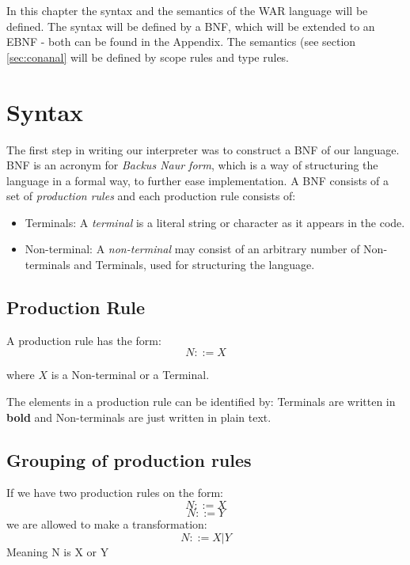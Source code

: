 In this chapter the syntax and the semantics of the WAR language will be defined. The syntax will be defined by a BNF, which will be extended to an EBNF - both can be found in the Appendix. The semantics (see section \ref{sec:conanal} will be defined by scope rules and type rules.
\section{Syntax}
	The first step in writing our interpreter was to construct a BNF of our language. 
	BNF is an acronym for {\it Backus Naur form}, which is a way of
	structuring the language in a formal way, to further ease implementation. 
	A BNF consists of a set of {\it production rules} and each
	production rule consists of:
	\begin{itemize}
		 \item Terminals: A {\it terminal } is a literal string or character as it appears in the code.
		 \item Non-terminal: A {\it non-terminal } may consist of an arbitrary number of Non-terminals and Terminals, used for structuring the language.
	\end{itemize}
	
	\subsection*{Production Rule}
		A production rule has the form:
		\begin{equation}
			N ::= X
		\end{equation}
		
		where $X$ is a Non-terminal or a Terminal.
		
		The elements in a production rule can be identified by:
		Terminals are written in {\bf bold } and 
		Non-terminals are just written in plain text.
	\subsection*{Grouping of production rules}
		If we have two production rules on the form:
		\begin{equation}
			N ::= X 
		\end{equation}
		\begin{equation}
			N ::= Y 
		\end{equation}
		we are allowed to make a transformation:
		\begin{equation}
			N ::= X | Y 
		\end{equation}
		Meaning N is X or Y
		
